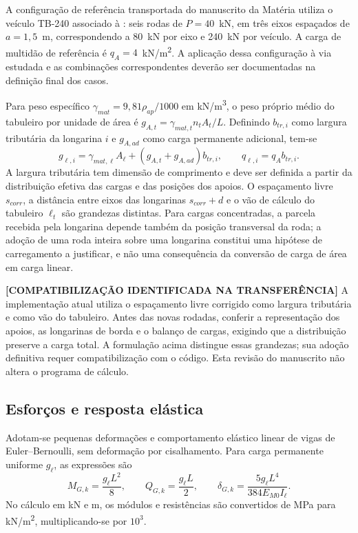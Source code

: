 A configuração de referência transportada do manuscrito da Matéria utiliza o veículo TB-240 associado à \textcite{nbr7188}: seis rodas de $P=40$~kN, em três eixos espaçados de $a=1{,}5$~m, correspondendo a 80~kN por eixo e 240~kN por veículo. A carga de multidão de referência é $q_A=4$~kN/m\textsuperscript{2}. A aplicação dessa configuração à via estudada e as combinações correspondentes deverão ser documentadas na definição final dos casos.

Para peso específico $\gamma_{mat}=9{,}81\rho_{ap}/1000$ em kN/m\textsuperscript{3}, o peso próprio médio do tabuleiro por unidade de área é $g_{A,t}=\gamma_{mat,t}n_tA_t/L$. Definindo $b_{tr,i}$ como largura tributária da longarina $i$ e $g_{A,ad}$ como carga permanente adicional, tem-se
\begin{equation}
 g_{\ell,i}=\gamma_{mat,\ell}A_\ell+(g_{A,t}+g_{A,ad})b_{tr,i},
 \qquad q_{\ell,i}=q_A b_{tr,i}.
\label{eq:acoes_lineares}
\end{equation}
A largura tributária tem dimensão de comprimento e deve ser definida a partir da distribuição efetiva das cargas e das posições dos apoios. O espaçamento livre $s_{corr}$, a distância entre eixos das longarinas $s_{corr}+d$ e o vão de cálculo do tabuleiro $\ell_t$ são grandezas distintas. Para cargas concentradas, a parcela recebida pela longarina depende também da posição transversal da roda; a adoção de uma roda inteira sobre uma longarina constitui uma hipótese de carregamento a justificar, e não uma consequência da conversão de carga de área em carga linear.

\begin{fillblock}
\noindent\textbf{[COMPATIBILIZAÇÃO IDENTIFICADA NA TRANSFERÊNCIA]} A implementação atual utiliza o espaçamento livre corrigido como largura tributária e como vão do tabuleiro. Antes das novas rodadas, conferir a representação dos apoios, as longarinas de borda e o balanço de cargas, exigindo que a distribuição preserve a carga total. A formulação acima distingue essas grandezas; sua adoção definitiva requer compatibilização com o código. Esta revisão do manuscrito não altera o programa de cálculo.
\end{fillblock}

\subsection{Esforços e resposta elástica}\label{sec:esforcos}

Adotam-se pequenas deformações e comportamento elástico linear de vigas de Euler--Bernoulli, sem deformação por cisalhamento. Para carga permanente uniforme $g_\ell$, as expressões são
\begin{equation}
 M_{G,k}=\frac{g_\ell L^2}{8},\qquad
 Q_{G,k}=\frac{g_\ell L}{2},\qquad
 \delta_{G,k}=\frac{5g_\ell L^4}{384E_{M0}I_\ell}.
\label{eq:permanentes_modelo}
\end{equation}
No cálculo em kN e m, os módulos e resistências são convertidos de MPa para kN/m\textsuperscript{2}, multiplicando-se por $10^3$.

